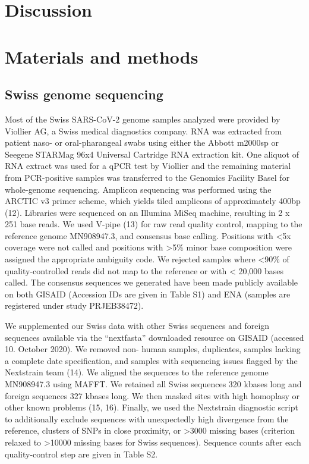 \documentclass[9pt,twocolumn,twoside,lineno]{pnas-new}
\begin{document}
\section{Discussion}

\section{Materials and methods}
\subsection{Swiss genome sequencing}
Most of the Swiss SARS-CoV-2 genome samples analyzed were provided by Viollier AG, a Swiss medical diagnostics company. RNA was extracted from patient naso- or oral-pharangeal swabs using either the Abbott m2000sp or Seegene STARMag 96x4 Universal Cartridge RNA extraction kit. One aliquot of RNA extract was used for a qPCR test by Viollier and the remaining material from PCR-positive samples was transferred to the Genomics Facility Basel for whole-genome sequencing. Amplicon sequencing was performed using the ARCTIC v3 primer scheme, which yields tiled amplicons of approximately 400bp (12). Libraries were sequenced on an Illumina MiSeq machine, resulting in 2 x 251 base reads. We used V-pipe (13) for raw read quality control, mapping to the reference genome MN908947.3, and consensus base calling. Positions with <5x coverage were not called and positions with >5\% minor base composition were assigned the appropriate ambiguity code. We rejected samples where <90\% of quality-controlled reads did not map to the reference or with < 20,000 bases called. The consensus sequences we generated have been made publicly available on both GISAID (Accession IDs are given in Table S1) and ENA (samples are registered under study PRJEB38472).

We supplemented our Swiss data with other Swiss sequences and foreign sequences available via the “nextfasta” downloaded resource on GISAID (accessed 10. October 2020). We removed non- human samples, duplicates, samples lacking a complete date specification, and samples with sequencing issues flagged by the Nextstrain team (14). We aligned the sequences to the reference genome MN908947.3 using MAFFT. We retained all Swiss sequences 320 kbases long and foreign sequences 327 kbases long. We then masked sites with high homoplasy or other known problems (15, 16). Finally, we used the Nextstrain diagnostic script to additionally exclude sequences with unexpectedly high divergence from the reference, clusters of SNPs in close proximity, or >3000 missing bases (criterion relaxed to >10000 missing bases for Swiss sequences). Sequence counts after each quality-control step are given in Table S2.
\end{document}

